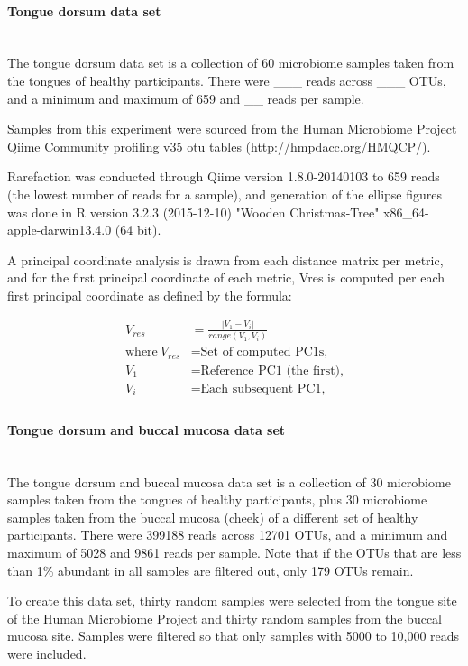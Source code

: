 \documentclass[10pt,letterpaper]{article}
\begin{document}
\paragraph{Tongue dorsum data set}\mbox{}\\
The tongue dorsum data set is a collection of 60 microbiome samples taken from the tongues of healthy participants. There were ___ reads across ___ OTUs, and a minimum and maximum of 659 and __ reads per sample.

Samples from this experiment were sourced from the Human Microbiome Project \cite{turnbaugh2007human} Qiime Community profiling v35 otu tables (\url{http://hmpdacc.org/HMQCP/}).

Rarefaction was conducted through Qiime version 1.8.0-20140103 to 659 reads (the lowest number of reads for a sample), and generation of the ellipse figures was done in R version 3.2.3 (2015-12-10) "Wooden Christmas-Tree" x86\_64-apple-darwin13.4.0 (64 bit).

A principal coordinate analysis is drawn from each distance matrix per metric, and for the first principal coordinate of each metric, Vres is computed per each first principal coordinate as defined by the formula:

\begin{align*}
  V_{res} &=\frac{|V_1 - V_i|}{range(V_1, V_i)} \\
  \text{where}~V_{res}&= \text{Set of computed PC1s,} \\
  V_1 &= \text{Reference PC1 (the first),} \\
  V_i &= \text{Each subsequent PC1,} \\
\end{align*}

\paragraph{Tongue dorsum and buccal mucosa data set}\mbox{}\\
The tongue dorsum and buccal mucosa data set is a collection of 30 microbiome samples taken from the tongues of healthy participants, plus 30 microbiome samples taken from the buccal mucosa (cheek) of a different set of healthy participants. There were 399188 reads across 12701 OTUs, and a minimum and maximum of 5028 and 9861 reads per sample. Note that if the OTUs that are less than 1\% abundant in all samples are filtered out, only 179 OTUs remain.

To create this data set, thirty random samples were selected from the tongue site of the Human Microbiome Project \cite{turnbaugh2007human} and thirty random samples from the buccal mucosa site. Samples were filtered so that only samples with 5000 to 10,000 reads were included.
\end{document}
